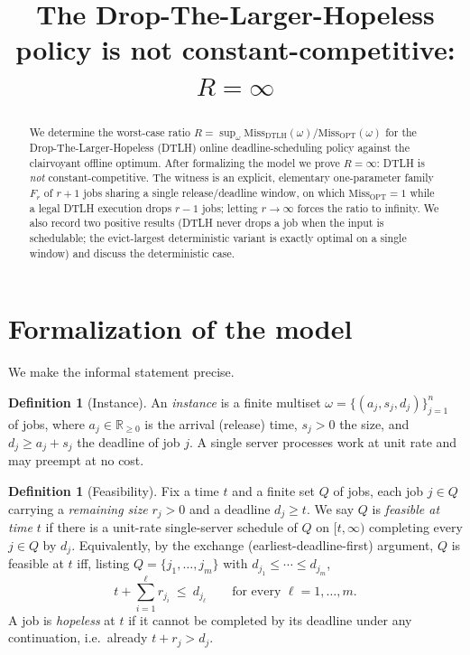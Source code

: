 \documentclass{amsart}
\theoremstyle{definition}
\newtheorem{definition}[theorem]{Definition}
\begin{document}
\title{The Drop-The-Larger-Hopeless policy is not constant-competitive:
$R=\infty$}
\maketitle

\begin{abstract}
We determine the worst-case ratio
$R=\sup_\omega \mathrm{Miss}_{\mathrm{DTLH}}(\omega)/\mathrm{Miss}_{\mathrm{OPT}}(\omega)$
for the Drop-The-Larger-Hopeless (DTLH) online deadline-scheduling policy
against the clairvoyant offline optimum. After formalizing the model we prove
$R=\infty$: DTLH is \emph{not} constant-competitive. The witness is an explicit,
elementary one-parameter family $F_r$ of $r+1$ jobs sharing a single
release/deadline window, on which $\mathrm{Miss}_{\mathrm{OPT}}=1$ while a legal
DTLH execution drops $r-1$ jobs; letting $r\to\infty$ forces the ratio to
infinity. We also record two positive results (DTLH never drops a job when the
input is schedulable; the evict-largest deterministic variant is exactly optimal
on a single window) and discuss the deterministic case.
\end{abstract}

\section{Formalization of the model}

We make the informal statement precise.

\begin{definition}[Instance]
An \emph{instance} is a finite multiset
$\omega=\{(a_j,s_j,d_j)\}_{j=1}^{n}$ of jobs, where $a_j\in\mathbb{R}_{\ge 0}$
is the arrival (release) time, $s_j>0$ the size, and $d_j\ge a_j+s_j$ the
deadline of job $j$. A single server processes work at unit rate and may
preempt at no cost.
\end{definition}

\begin{definition}[Feasibility]\label{def:feas}
Fix a time $t$ and a finite set $Q$ of jobs, each job $j\in Q$ carrying a
\emph{remaining size} $r_j>0$ and a deadline $d_j\ge t$. We say $Q$ is
\emph{feasible at time $t$} if there is a unit-rate single-server schedule of
$Q$ on $[t,\infty)$ completing every $j\in Q$ by $d_j$. Equivalently, by the
exchange (earliest-deadline-first) argument, $Q$ is feasible at $t$ iff, listing
$Q=\{j_1,\dots,j_m\}$ with $d_{j_1}\le\cdots\le d_{j_m}$,
\begin{equation}\label{eq:edf}
t+\sum_{i=1}^{\ell} r_{j_i}\ \le\ d_{j_\ell}\qquad\text{for every }\ell=1,\dots,m.
\end{equation}
A job is \emph{hopeless} at $t$ if it cannot be completed by its deadline under
any continuation, i.e.\ already $t+r_j>d_j$.
\end{definition}
\end{document}
